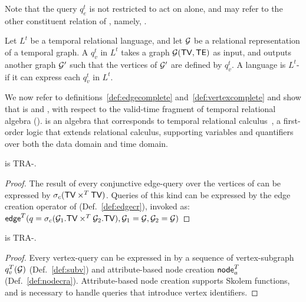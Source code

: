 Note that the query $q^t_e$ is not restricted to act on \te alone, and
may refer to the other constituent relation of \tve, namely, \tv.

\begin{definition}
  Let $L^t$ be a temporal relational language, and let $\mathcal{G}$ be a
  relational representation of a temporal graph.  A \vertexq $q^t_v$
  in $L^t$ takes a graph $\mathcal{G} (\textsf{TV}, \textsf{TE})$ as input, and
  outputs another graph $\mathcal{G}'$ such that the vertices of $\mathcal{G}'$ are
  defined by $q^t_v$. A language is $L^t$-\vertexc if it can express
  each $q^t_v$ in $L^t$.
\label{def:vertexcomplete}
\end{definition}

We now refer to definitions~\ref{def:edgecomplete}
and~\ref{def:vertexcomplete} and show that \tga is \edgec and
\vertexc, with respect to the valid-time fragment of temporal
relational algebra (\tra).  \tra is an algebra that corresponds to
temporal relational calculus~\cite{DBLP:reference/db/ChomickiT09b}, a
first-order logic that extends relational calculus, supporting
variables and quantifiers over both the data domain and time domain.

\begin{theorem}
\tga is TRA-\edgec.
\label{th:edgecomplete}
\end{theorem}

\begin{proof}
  The result of every conjunctive edge-query over the vertices of \ttt
  can be expressed by $\sigma_{c} (\textsf{TV} \times^T \textsf{TV})$.  Queries of
  this kind can be expressed by the edge creation operator of \tga
  (Def.~\ref{def:edgecr}), invoked as:\\
  $\textsf{edge}^T(q=\sigma_{c} (\mathcal{G}_1.\textsf{TV} \times^T \mathcal{G}_2.\textsf{TV}),\mathcal{G}_1
  = \mathcal{G},\mathcal{G}_2=\mathcal{G})$\end{proof}

\begin{theorem}
\tga is TRA-\vertexc.
\label{th:vertexcomplete}
\end{theorem}

\begin{proof}
  Every \tra vertex-query can be expressed in \tga
  by a sequence of vertex-subgraph $q^T_v(\mathcal{G})$
  (Def.~\ref{def:subv}) and attribute-based node creation
  $\textsf{node}^T_a$ (Def.~\ref{def:nodecra}).
  Attribute-based node creation supports Skolem functions, and is
  necessary to handle queries that introduce vertex identifiers.  
\end{proof}


